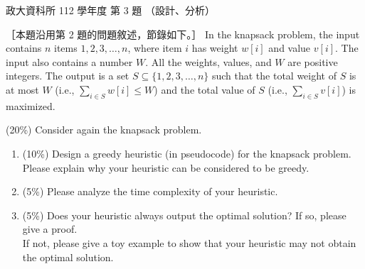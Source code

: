 \begin{pastexam}[label={px:nccu-112-dsa-03}]{政大資科所 112 學年度 第 3 題}
（設計、分析）

［本題沿用第 2 題的問題敘述，節錄如下。］
In the knapsack problem, the input contains $n$ items $1,2,3,\dots,n$, where item $i$ has weight
$w[i]$ and value $v[i]$. The input also contains a number $W$. All the weights, values, and $W$ are
positive integers. The output is a set $S\subseteq\{1,2,3,\dots,n\}$ such that the total weight of
$S$ is at most $W$ (i.e., $\sum_{i\in S}w[i]\le W$) and the total value of $S$ (i.e.,
$\sum_{i\in S}v[i]$) is maximized.

\medskip
(20\%) Consider again the knapsack problem.
\begin{enumerate}[label=\arabic*),itemsep=2pt,topsep=2pt]
\item (10\%) Design a greedy heuristic (in pseudocode) for the knapsack problem.\\
Please explain why your heuristic can be considered to be greedy.
\item (5\%) Please analyze the time complexity of your heuristic.
\item (5\%) Does your heuristic always output the optimal solution? If so, please give a proof.\\
If not, please give a toy example to show that your heuristic may not obtain the optimal solution.
\end{enumerate}
\end{pastexam}

